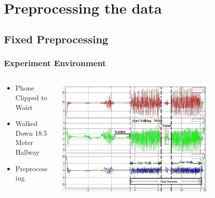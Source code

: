 \documentclass{beamer}
\begin{document}
\section[Preprocessing the data]{Preprocessing the data}


\subsection{Fixed Preprocessing}
\begin{frame}
  \frametitle{Experiment Environment}
  \begin{columns}
  \begin{column}{0.4\textwidth}
  \begin{itemize}
    \item Phone Clipped to Waist 
  	\linebreak
  	\item Walked Down 18.5 Meter Hallway
  	\linebreak
	\item Preprocessing
  \end{itemize}
  \end{column}
  \begin{column}{0.8\textwidth}
   \includegraphics[width=0.8\textwidth]{Illustrations/gaitpatterns.png}
       \\
  \end{column}
  \end{columns}
\end{frame}
\end{document}
